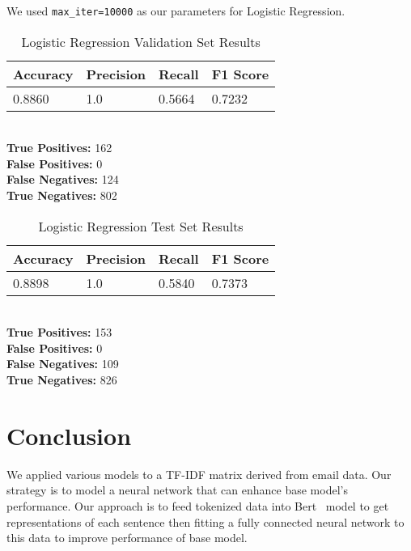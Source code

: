 \documentclass[conference]{IEEEtran}
\begin{document}
We used \verb|max_iter=10000| as our parameters for Logistic Regression.

\begin{table}[H]
    \caption{Logistic Regression Validation Set Results}

    \begin{tabularx}{\linewidth}{|X|X|X|X|}
        \hline
        \textbf{Accuracy} & \textbf{Precision} & \textbf{Recall} & \textbf{F1 Score} \\
        \hline
        0.8860 & 1.0 & 0.5664 & 0.7232 \\
        \hline
    \end{tabularx}\\

    \textbf{True Positives:} 162\\
    \textbf{False Positives:} 0\\
    \textbf{False Negatives:} 124\\
    \textbf{True Negatives:} 802
    \label{tab:lr1}
\end{table}

\begin{table}[H]
    \caption{Logistic Regression Test Set Results}

    \begin{tabularx}{\linewidth}{|X|X|X|X|}
        \hline
        \textbf{Accuracy} & \textbf{Precision} & \textbf{Recall} & \textbf{F1 Score} \\
        \hline
        0.8898 & 1.0 & 0.5840 & 0.7373 \\
        \hline
    \end{tabularx}\\

    \textbf{True Positives:} 153\\
    \textbf{False Positives:} 0\\
    \textbf{False Negatives:} 109\\
    \textbf{True Negatives:} 826
    \label{tab:lr2}
\end{table}

\section{Conclusion}
We applied various models to a TF-IDF matrix derived from email data. Our strategy is to model a neural network that can enhance base model's performance. Our approach is to feed tokenized data into Bert \cite{bert} model to get representations of each sentence then fitting a fully connected neural network to this data to improve performance of base model. 
\end{document}
